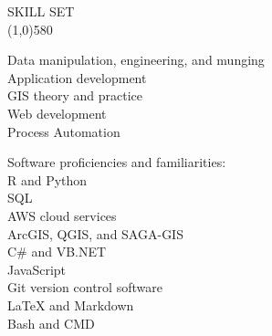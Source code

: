 \documentclass{article}
\begin{document}
\noindent \large{SKILL SET}\\ 
\line(1,0){580}\\
\parbox[t][3cm][t]{0.4\textwidth}{
	\textbullet Data manipulation, engineering, and munging\\
	\textbullet Application development\\
	\textbullet GIS theory and practice\\
	\textbullet Web development\\
    \textbullet Process Automation\\
} 
\parbox[t][2.5cm][t]{0.07\textwidth}{\hfil}
\parbox[t][3.2cm][t]{0.45\textwidth}{
	Software proficiencies and familiarities:\\
	\small{
		\textbullet R and Python\\
		\textbullet SQL\\
		\textbullet AWS cloud services\\
		\textbullet ArcGIS, QGIS, and SAGA-GIS\\
		\textbullet C\# and VB.NET\\
		\textbullet JavaScript\\
		\textbullet Git version control software\\
		\textbullet \LaTeX{} and Markdown\\
		\textbullet Bash and CMD\\
	}
}
\end{document}
